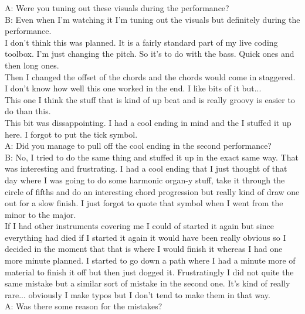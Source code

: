 \documentclass[12pt]{article}
\begin{document}
A: Were you tuning out these visuals during the performance?\\

B: Even when I'm watching it I'm tuning out the visuals but definitely during the performance.\\

I don't think this was planned. It is a fairly standard part of my live coding toolbox. I'm just changing the pitch. So it's to do with the bass. Quick ones and then long ones.\\

Then I changed the offset of the chords and the chords would come in staggered. I don't know how well this one worked in the end. I like bits of it but...\\

This one I think the stuff that is kind of up beat and is really groovy is easier to do than this.\\

This bit was dissappointing. I had a cool ending in mind and the I stuffed it up here. I forgot to put the tick symbol.\\

A: Did you manage to pull off the cool ending in the second performance?\\

B: No, I tried to do the same thing and stuffed it up in the exact same way. That was interesting and frustrating. I had a cool ending that I just thought of that day where I was going to do some harmonic organ-y stuff, take it through the circle of fifths and do an interesting chord progression but really kind of draw one out for a slow finish. I just forgot to quote that symbol when I went from the minor to the major.\\

If I had other instruments covering me I could of started it again but since everything had died if I started it again it would have been really obvious so I decided in the moment that that is where I would finish it whereas I had one more minute planned. I started to go down a path where I had a minute more of material to finish it off but then just dogged it. Frustratingly I did not quite the same mistake but a similar sort of mistake in the second one. It's kind of really rare... obviously I make typos but I don't tend to make them in that way.\\

A: Was there some reason for the mistakes?\\
\end{document}
